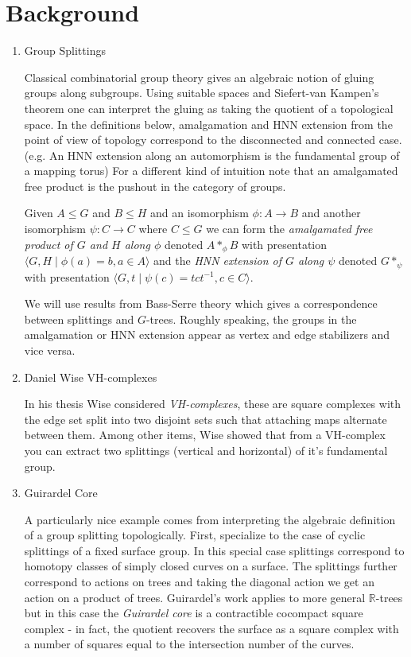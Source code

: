 \documentclass{article}
\theoremstyle{mystyle}
\theoremstyle{remark}
\begin{document}
\section{Background}

\begin{enumerate}
    \item Group Splittings
    
        Classical combinatorial group theory gives an algebraic notion of gluing groups along subgroups. Using suitable spaces and Siefert-van Kampen's theorem one can interpret the gluing as taking the quotient of a topological space. In the definitions below, amalgamation and HNN extension from the point of view of topology correspond to the disconnected and connected case. (e.g. An HNN extension along an automorphism is the fundamental group of a mapping torus) For a different kind of intuition note that an amalgamated free product is the pushout in the category of groups.
        
        Given \(A\leq G\) and \(B\leq H\) and an isomorphism \(\phi:A\to B\) and another isomorphism \(\psi: C\to C\) where \(C\leq G\) we can form the {\em amalgamated free product of \(G\) and \(H\) along \(\phi\)} denoted \(A*_\phi B\) with presentation \(\langle G, H\mid \phi(a) = b, a\in A\rangle\) and the {\em HNN extension of \(G\) along \(\psi\)} denoted \(G*_\psi\) with presentation \(\langle G, t\mid \psi(c)=tct^{-1}, c\in C\rangle\). 
        
        We will use results from Bass-Serre theory which gives a correspondence between splittings and \(G\)-trees. Roughly speaking, the groups in the amalgamation or HNN extension appear as vertex and edge stabilizers and vice versa.
    \item Daniel Wise VH-complexes
    
        In his thesis Wise considered {\em VH-complexes}, these are square complexes with the edge set split into two disjoint sets such that attaching maps alternate between them. Among other items, Wise showed that from a VH-complex you can extract two splittings (vertical and horizontal) of it's fundamental group.
    \item Guirardel Core
    
        A particularly nice example comes from interpreting the algebraic definition of a group splitting topologically. First, specialize to the case of cyclic splittings of a fixed surface group. In this special case splittings correspond to homotopy classes of simply closed curves on a surface. The splittings further correspond to actions on trees and taking the diagonal action we get an action on a product of trees. Guirardel's work applies to more general \(\mathbb{R}\)-trees but in this case the {\em Guirardel core} is a contractible cocompact square complex - in fact, the quotient recovers the surface as a square complex with a number of squares equal to the intersection number of the curves.
\end{enumerate}
\end{document}
